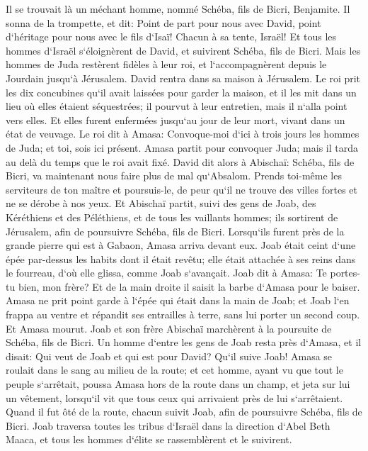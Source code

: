 \verse Il se trouvait là un méchant homme, nommé Schéba, fils de Bicri, Benjamite. Il sonna de la trompette, et dit: Point de part pour nous avec David, point d`héritage pour nous avec le fils d`Isaï! Chacun à sa tente, Israël! 
\verse Et tous les hommes d`Israël s`éloignèrent de David, et suivirent Schéba, fils de Bicri. Mais les hommes de Juda restèrent fidèles à leur roi, et l`accompagnèrent depuis le Jourdain jusqu`à Jérusalem. 
\verse David rentra dans sa maison à Jérusalem. Le roi prit les dix concubines qu`il avait laissées pour garder la maison, et il les mit dans un lieu où elles étaient séquestrées; il pourvut à leur entretien, mais il n`alla point vers elles. Et elles furent enfermées jusqu`au jour de leur mort, vivant dans un état de veuvage. 
\verse Le roi dit à Amasa: Convoque-moi d`ici à trois jours les hommes de Juda; et toi, sois ici présent. 
\verse Amasa partit pour convoquer Juda; mais il tarda au delà du temps que le roi avait fixé. 
\verse David dit alors à Abischaï: Schéba, fils de Bicri, va maintenant nous faire plus de mal qu`Absalom. Prends toi-même les serviteurs de ton maître et poursuis-le, de peur qu`il ne trouve des villes fortes et ne se dérobe à nos yeux. 
\verse Et Abischaï partit, suivi des gens de Joab, des Kéréthiens et des Péléthiens, et de tous les vaillants hommes; ils sortirent de Jérusalem, afin de poursuivre Schéba, fils de Bicri. 
\verse Lorsqu`ils furent près de la grande pierre qui est à Gabaon, Amasa arriva devant eux. Joab était ceint d`une épée par-dessus les habits dont il était revêtu; elle était attachée à ses reins dans le fourreau, d`où elle glissa, comme Joab s`avançait. 
\verse Joab dit à Amasa: Te portes-tu bien, mon frère? Et de la main droite il saisit la barbe d`Amasa pour le baiser. 
\verse Amasa ne prit point garde à l`épée qui était dans la main de Joab; et Joab l`en frappa au ventre et répandit ses entrailles à terre, sans lui porter un second coup. Et Amasa mourut. Joab et son frère Abischaï marchèrent à la poursuite de Schéba, fils de Bicri. 
\verse Un homme d`entre les gens de Joab resta près d`Amasa, et il disait: Qui veut de Joab et qui est pour David? Qu`il suive Joab! 
\verse Amasa se roulait dans le sang au milieu de la route; et cet homme, ayant vu que tout le peuple s`arrêtait, poussa Amasa hors de la route dans un champ, et jeta sur lui un vêtement, lorsqu`il vit que tous ceux qui arrivaient près de lui s`arrêtaient. 
\verse Quand il fut ôté de la route, chacun suivit Joab, afin de poursuivre Schéba, fils de Bicri. 
\verse Joab traversa toutes les tribus d`Israël dans la direction d`Abel Beth Maaca, et tous les hommes d`élite se rassemblèrent et le suivirent. 
